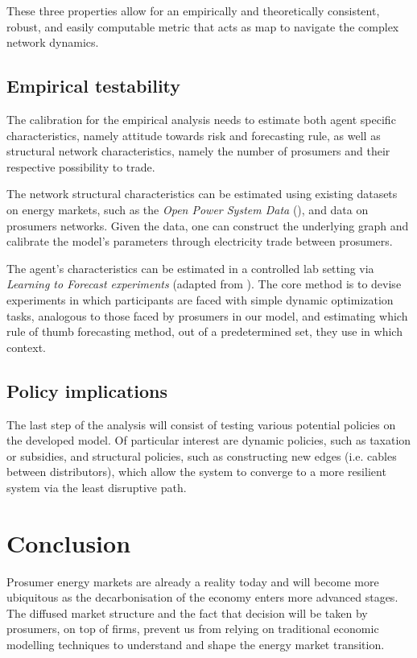 \documentclass[american]{scrartcl}
\begin{document}
These three properties allow for an empirically and theoretically consistent, robust, and easily computable metric that acts as map to navigate the complex network dynamics.

\subsection{Empirical testability}

The calibration for the empirical analysis needs to estimate both agent specific characteristics, namely attitude towards risk and forecasting rule, as well as structural network characteristics, namely the number of prosumers and their respective possibility to trade.

The network structural characteristics can be estimated using existing datasets on energy markets, such as the \textit{Open Power System Data} (\cite{Wiese2019}), and data on prosumers networks. Given the data, one can construct the underlying graph and calibrate the model's parameters through electricity trade between prosumers.

The agent's characteristics can be estimated in a controlled lab setting via \textit{Learning to Forecast experiments} (adapted from \cite{Hommes2013}). The core method is to devise experiments in which participants are faced with simple dynamic optimization tasks, analogous to those faced by prosumers in our model, and estimating which rule of thumb forecasting method, out of a predetermined set, they use in which context.

\subsection{Policy implications}

The last step of the analysis will consist of testing various potential policies on the developed model. Of particular interest are dynamic policies, such as taxation or subsidies, and structural policies, such as constructing new edges (i.e. cables between distributors), which allow the system to converge to a more resilient system via the least disruptive path.

\section{Conclusion}

Prosumer energy markets are already a reality today and will become more ubiquitous as the decarbonisation of the economy enters more advanced stages. The diffused market structure and the fact that decision will be taken by prosumers, on top of firms, prevent us from relying on traditional economic modelling techniques to understand and shape the energy market transition.
\end{document}
